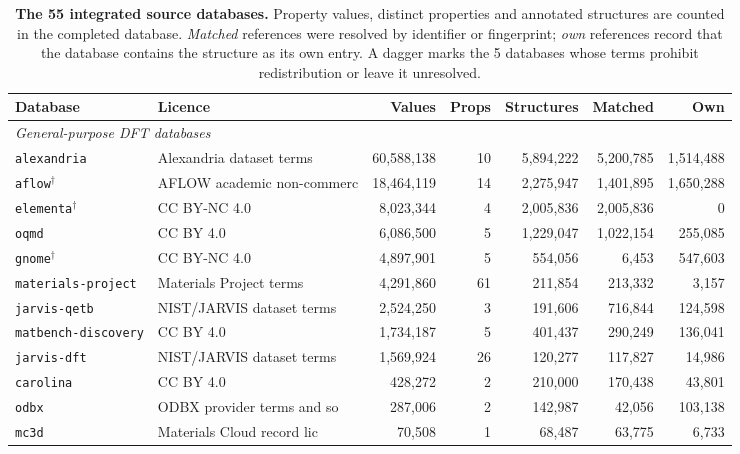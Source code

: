 \begin{table}[htbp]
\centering\footnotesize
\caption{\textbf{The 55 integrated source databases.} Property values, distinct properties and annotated structures are counted in the completed database. \emph{Matched} references were resolved by identifier or fingerprint; \emph{own} references record that the database contains the structure as its own entry. A dagger marks the 5 databases whose terms prohibit redistribution or leave it unresolved.}
\label{tab:sources}
\begin{tabular}{llrrrrr}
\toprule
Database & Licence & Values & Props & Structures & Matched & Own \\
\midrule
\multicolumn{7}{l}{\textit{General-purpose DFT databases}} \\[1pt]
\quad \texttt{alexandria} & Alexandria dataset terms & 60{,}588{,}138 & 10 & 5{,}894{,}222 & 5{,}200{,}785 & 1{,}514{,}488 \\
\quad \texttt{aflow}$^{\dagger}$ & AFLOW academic non-commerc & 18{,}464{,}119 & 14 & 2{,}275{,}947 & 1{,}401{,}895 & 1{,}650{,}288 \\
\quad \texttt{elementa}$^{\dagger}$ & CC BY-NC 4.0 & 8{,}023{,}344 & 4 & 2{,}005{,}836 & 2{,}005{,}836 & 0 \\
\quad \texttt{oqmd} & CC BY 4.0 & 6{,}086{,}500 & 5 & 1{,}229{,}047 & 1{,}022{,}154 & 255{,}085 \\
\quad \texttt{gnome}$^{\dagger}$ & CC BY-NC 4.0 & 4{,}897{,}901 & 5 & 554{,}056 & 6{,}453 & 547{,}603 \\
\quad \texttt{materials-project} & Materials Project terms & 4{,}291{,}860 & 61 & 211{,}854 & 213{,}332 & 3{,}157 \\
\quad \texttt{jarvis-qetb} & NIST/JARVIS dataset terms & 2{,}524{,}250 & 3 & 191{,}606 & 716{,}844 & 124{,}598 \\
\quad \texttt{matbench-discovery} & CC BY 4.0 & 1{,}734{,}187 & 5 & 401{,}437 & 290{,}249 & 136{,}041 \\
\quad \texttt{jarvis-dft} & NIST/JARVIS dataset terms & 1{,}569{,}924 & 26 & 120{,}277 & 117{,}827 & 14{,}986 \\
\quad \texttt{carolina} & CC BY 4.0 & 428{,}272 & 2 & 210{,}000 & 170{,}438 & 43{,}801 \\
\quad \texttt{odbx} & ODBX provider terms and so & 287{,}006 & 2 & 142{,}987 & 42{,}056 & 103{,}138 \\
\quad \texttt{mc3d} & Materials Cloud record lic & 70{,}508 & 1 & 68{,}487 & 63{,}775 & 6{,}733 \\

\end{tabular}
\end{table}

